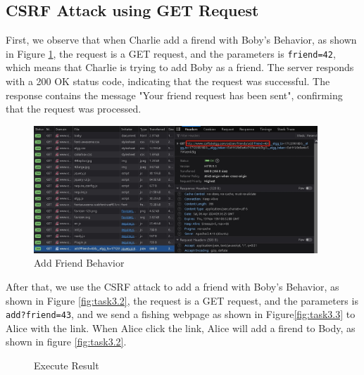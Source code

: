 \documentclass[a4paper,11pt]{article}
\begin{document}
\subsection{CSRF Attack using GET Request}

First, we observe that when Charlie add a firend with Boby's Behavior, as shown in Figure \ref{fig:task3.1}, the request is a GET request, and the parameters is \verb|friend=42|, which means that Charlie is trying to add Boby as a friend. The server responds with a 200 OK status code, indicating that the request was successful. The response contains the message "Your friend request has been sent", confirming that the request was processed.

\begin{figure}[h]
    \centering
       \includegraphics[width=0.95\textwidth]{figures/task3/task3.1.png}
    \caption{Add Friend Behavior}\label{fig:task3.1}
\end{figure}

After that, we use the CSRF attack to add a friend with Boby's Behavior, as shown in Figure \ref{fig:task3.2}, the request is a GET request, and the parameters is \verb|add?friend=43|, and we send a fishing webpage as shown in Figure\ref{fig:task3.3} to Alice with the link. When Alice click the link, Alice will add a firend to Body, as shown in figure \ref{fig:task3.2}. 

\begin{figure}[h]
    \centering
    \hfill
    \hfill
    \caption{Execute Result}\label{fig:task3}
\end{figure}
\end{document}
